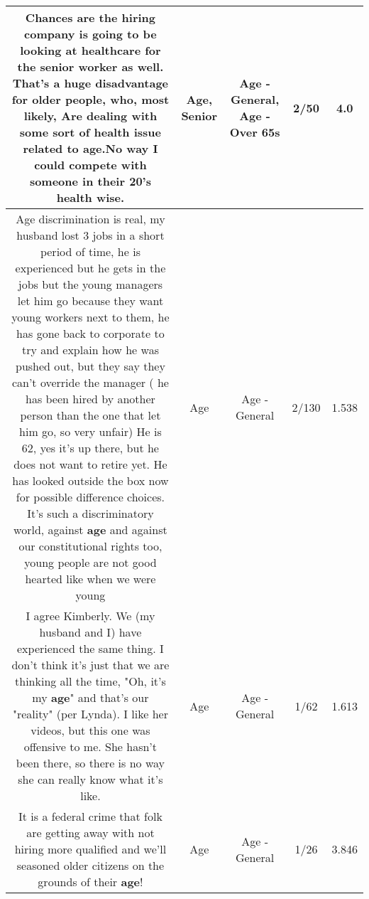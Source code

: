 \documentclass[11pt]{article}
\newlength\mylength
\begin{document}
\begin{center}
\begin{longtable}{|C{.65\mylength}|C{.30\mylength}|C{.12\mylength}|C{.12\mylength}|C{.12\mylength}|}
  \small Chances are the hiring company is going to be looking at healthcare for the \textbf{senior} worker as well. That's a huge disadvantage for older people, who, most likely, Are dealing with some sort of health issue related to \textbf{age}.No way I could compete with someone in their 20's health wise.\normalsize   & Age, Senior & Age - General, Age - Over 65s & 2/50 & 4.0 \\  \hline
  \small Age discrimination is real, my husband lost 3 jobs in a short period of time, he is experienced but he gets  in the jobs but the young  managers let him go because they want young workers next to them, he has gone back to corporate to try and explain how he was pushed out, but they say they can't override the manager ( he has been hired by another person than the one that let him go, so very unfair) He is 62, yes it's up there, but he does not want to retire yet.  He has looked outside the box now for possible difference choices.  It's such a discriminatory world, against \textbf{age} and against our constitutional rights too,  young people are not good hearted like when we were young\normalsize   & Age & Age - General & 2/130 & 1.538 \\  \hline
  \small I agree Kimberly. We (my husband and I) have experienced the same thing. I don't think it's just that we are thinking all the time, "Oh, it's my \textbf{age}" and that's our "reality" (per Lynda). I like her videos, but this one was offensive to me. She hasn't been there, so there is no way she can really know what it's like.\normalsize   & Age & Age - General & 1/62 & 1.613 \\  \hline
  \small It is a federal crime that folk are getting away with not hiring more qualified and we'll seasoned older citizens on the grounds of their \textbf{age}!\normalsize   & Age & Age - General & 1/26 & 3.846 \\  \hline

\end{longtable}
\end{center}
\end{document}
